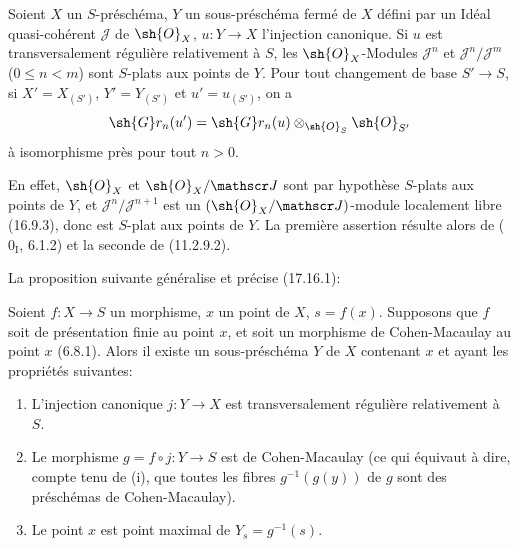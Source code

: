 
\begin{proposition}[19.2.8]
\label{IV.19.2.8}
Soient $X$ un $S$-préschéma, $Y$ un sous-préschéma fermé de $X$ défini par un Idéal quasi-cohérent $\mathscr J$ de $\sh{O}_X$, $u:Y\to X$ l'injection canonique. Si $u$ est transversalement régulière relativement à $S$, les $\sh{O}_X$-Modules $\mathscr J^n$ et $\mathscr J^n/\mathscr J^m$ ($0\leq n<m$) sont $S$-plats aux points de $Y$. Pour tout changement de base $S'\to S$, si $X'=X_{(S')}$, $Y'=Y_{(S')}$ et $u'=u_{(S')}$, on a
\[
  \sh{G}r_n(u')=\sh{G}r_n(u)\otimes_{\sh{O}_S}\sh{O}_{S'}
\]
à isomorphisme près pour tout $n>0$.
\end{proposition}

En effet, $\sh{O}_X$ et $\sh{O}_X/\mathscr J$ sont par hypothèse $S$-plats aux points de $Y$, et $\mathscr J^n/\mathscr J^{n+1}$ est un $(\sh{O}_X/\mathscr J)$-module localement libre (16.9.3), donc est $S$-plat aux points de $Y$. La première assertion résulte alors de ($0_{\mathrm I}$, 6.1.2) et la seconde de (11.2.9.2).

La proposition suivante généralise et précise (17.16.1):

\begin{proposition}[19.2.9]
\label{IV.19.2.9}
Soient $f:X\to S$ un morphisme, $x$ un point de $X$, $s=f(x)$. Supposons que $f$ soit de présentation finie au point $x$, et soit un morphisme de Cohen-Macaulay au point $x$ (6.8.1). Alors il existe un sous-préschéma $Y$ de $X$ contenant $x$ et ayant les propriétés suivantes:
\begin{enumerate}
  \item[(i)] L'injection canonique $j:Y\to X$ est transversalement régulière relativement à $S$.
  \item[(ii)] Le morphisme $g=f\circ j:Y\to S$ est de Cohen-Macaulay (ce qui équivaut à dire, compte tenu de (i), que toutes les fibres $g^{-1}(g(y))$ de $g$ sont des préschémas de Cohen-Macaulay).
  \item[(iii)] Le point $x$ est point maximal de $Y_s=g^{-1}(s)$.
\end{enumerate}
\end{proposition}


